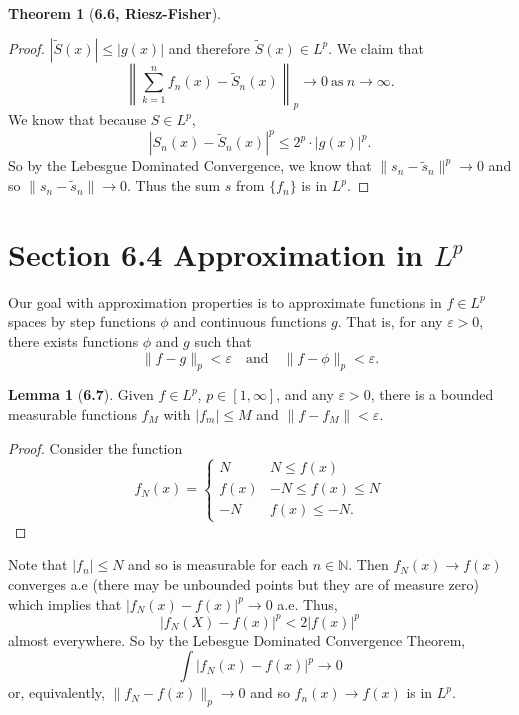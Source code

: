 \documentclass[12pt]{article}
\newcommand{\N}{\mathbb{N}}
\renewcommand{\epsilon}{\varepsilon}
\theoremstyle{definition}
\newtheorem*{thm}{Theorem}
\newtheorem*{lemma}{Lemma}
\begin{document}
\begin{thm}[\textbf{6.6, Riesz-Fisher}]
\begin{proof}
        \( |\widetilde{S}(x)| \leq |g(x)| \) and therefore \( \widetilde{S}(x) \in L^p \). We claim that
                \[
                    \left\lVert \sum_{k=1}^{n} f_n(x) - \widetilde{S}_n(x) \right\rVert_{p} \to 0 \ \text{as}\ n \to \infty. 
                \]
            We know that because \( S \in L^p \), 
                \[
                    \left| S_n(x) - \widetilde{S}_n(x) \right|^p \leq 2^p \cdot |g(x)|^p.
                \]
            So by the Lebesgue Dominated Convergence, we know that \( \lVert s_n  - \widetilde{s}_n \rVert^p \to 0 \) and so \( \lVert s_n - \widetilde{s}_n \rVert \to 0 \). Thus the sum \( s\) from \( \{f_n\} \) is in \( L^p \).
     \end{proof}
\end{thm}
    
\section*{Section 6.4 Approximation in \(L^p\)}

Our goal with approximation properties is to approximate functions in \( f \in  L^p \) spaces by step functions \( \phi \) and continuous functions \( g \). That is, for any \( \epsilon > 0 \), there exists functions \( \phi \) and \( g \) such that
     \[
        \lVert f - g\rVert_{p} < \epsilon \quad \text{and} \quad \lVert f - \phi \rVert_p < \epsilon.
     \]

\begin{lemma}[\textbf{6.7}]

    Given \( f \in L^p \), \( p \in [1, \infty] \), and any \( \epsilon > 0 \), there is a bounded measurable functions \( f_M \) with \( |f_m| \leq M \) and \( \lVert f - f_M \rVert < \epsilon \).

        \begin{proof}
            Consider the function 
                \[
                    f_N(x) = \begin{cases}
                        N & N \leq f(x) \\
                        f(x) & -N \leq f(x) \leq N \\
                        -N & f(x) \leq - N.
                    \end{cases}  
                \]
        \end{proof}
    Note that \( |f_n| \leq N \) and so is measurable for each \( n \in \N \). Then \( f_N(x) \to f(x) \) converges a.e (there may be unbounded points but they are of measure zero) which implies
    that 
    \( | f_N(x) - f(x)|^{p} \to 0 \) a.e. Thus,
        \[
            |f_N(X) - f(x)|^p < 2|f(x)|^p    
        \]
    almost everywhere. So by the Lebesgue Dominated Convergence Theorem,
        \[
            \int |f_N(x) - f(x) |^p \to 0   
        \]
    or, equivalently, \( \displaystyle \lVert f_N - f(x) \rVert_p \to 0 \) and so \( f_n(x) \to f(x) \) is in \( L^p \).
    
\end{lemma}
\end{document}
